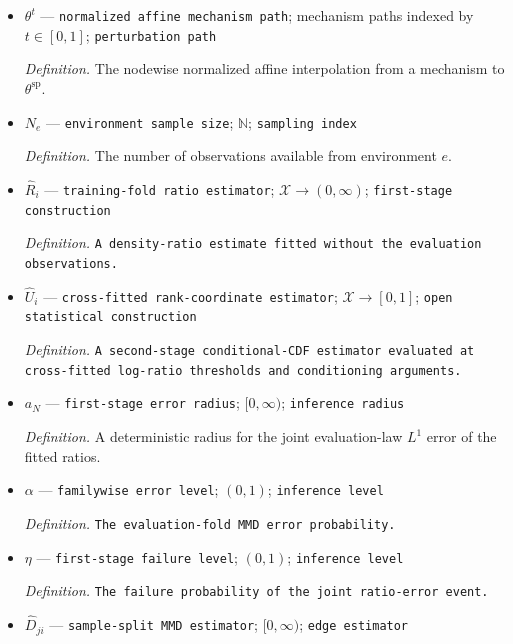 \documentclass{article}
\begin{document}
\begin{itemize}
  \par\smallskip\noindent\emph{Definition.} \texttt{The explicit faithful mechanism whose direct-\allowbreak{}edge ratio law is unchanged by intervention on the parent.}
  \item \(\theta^t\) --- \texttt{normalized affine mechanism path}; mechanism paths indexed by \(t\in[0,1]\); \texttt{perturbation path}
  \par\smallskip\noindent\emph{Definition.} The nodewise normalized affine interpolation from a mechanism to \(\theta^{\mathrm{sp}}\).
  \item \(N_e\) --- \texttt{environment sample size}; \(\mathbb N\); \texttt{sampling index}
  \par\smallskip\noindent\emph{Definition.} The number of observations available from environment \(e\).
  \item \(\widehat R_i\) --- \texttt{training-\allowbreak{}fold ratio estimator}; \(\mathcal X\to(0,\infty)\); \texttt{first-\allowbreak{}stage construction}
  \par\smallskip\noindent\emph{Definition.} \texttt{A density-\allowbreak{}ratio estimate fitted without the evaluation observations.}
  \item \(\widehat U_i\) --- \texttt{cross-\allowbreak{}fitted rank-\allowbreak{}coordinate estimator}; \(\mathcal X\to[0,1]\); \texttt{open statistical construction}
  \par\smallskip\noindent\emph{Definition.} \texttt{A second-\allowbreak{}stage conditional-\allowbreak{}CDF estimator evaluated at cross-\allowbreak{}fitted log-\allowbreak{}ratio thresholds and conditioning arguments.}
  \item \(a_N\) --- \texttt{first-\allowbreak{}stage error radius}; \([0,\infty)\); \texttt{inference radius}
  \par\smallskip\noindent\emph{Definition.} A deterministic radius for the joint evaluation-law \(L^1\) error of the fitted ratios.
  \item \(\alpha\) --- \texttt{familywise error level}; \((0,1)\); \texttt{inference level}
  \par\smallskip\noindent\emph{Definition.} \texttt{The evaluation-\allowbreak{}fold MMD error probability.}
  \item \(\eta\) --- \texttt{first-\allowbreak{}stage failure level}; \((0,1)\); \texttt{inference level}
  \par\smallskip\noindent\emph{Definition.} \texttt{The failure probability of the joint ratio-\allowbreak{}error event.}
  \item \(\widehat D_{ji}\) --- \texttt{sample-\allowbreak{}split MMD estimator}; \([0,\infty)\); \texttt{edge estimator}

\end{itemize}
\end{document}
